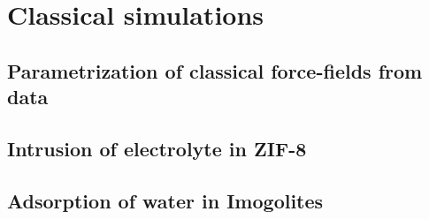 \documentclass[thesis]{subfiles}
\begin{document}
\OnlyInSubfile{\setcounter{chapter}{4}}

\chapter{Classical simulations}
\startcontents[chapters]
\printpartialtoc

\section{Parametrization of classical force-fields from \abinitio data}

\section{Intrusion of electrolyte in ZIF-8}

\section{Adsorption of water in Imogolites}
\end{document}
